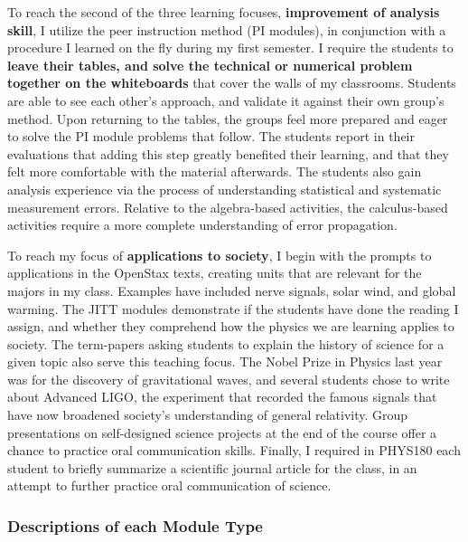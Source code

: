 \documentclass[../../../main.tex]{subfiles}
\begin{document}
To reach the second of the three learning focuses, \textbf{improvement of analysis skill}, I utilize the peer instruction method (PI modules), in conjunction with a procedure I learned on the fly during my first semester.  I require the students to \textbf{leave their tables, and solve the technical or numerical problem together on the whiteboards} that cover the walls of my classrooms.  Students are able to see each other's approach, and validate it against their own group's method.  Upon returning to the tables, the groups feel more prepared and eager to solve the PI module problems that follow.  The students report in their evaluations that adding this step greatly benefited their learning, and that they felt more comfortable with the material afterwards.  The students also gain analysis experience via the process of understanding statistical and systematic measurement errors.  Relative to the algebra-based activities, the calculus-based activities require a more complete understanding of error propagation. \\ \hspace{0.1cm}

To reach my focus of \textbf{applications to society}, I begin with the prompts to applications in the OpenStax texts, creating units that are relevant for the majors in my class.  Examples have included nerve signals, solar wind, and global warming.  The JITT modules demonstrate if the students have done the reading I assign, and whether they comprehend how the physics we are learning applies to society. The term-papers asking students to explain the history of science for a given topic also serve this teaching focus.  The Nobel Prize in Physics last year was for the discovery of gravitational waves, and several students chose to write about Advanced LIGO, the experiment that recorded the famous signals that have now broadened society's understanding of general relativity.  Group presentations on self-designed science projects at the end of the course offer a chance to practice oral communication skills.  Finally, I required in PHYS180 each student to briefly summarize a scientific journal article for the class, in an attempt to further practice oral communication of science. \\ \hspace{0.1cm}

\subsubsection{Descriptions of each Module Type}
\end{document}
